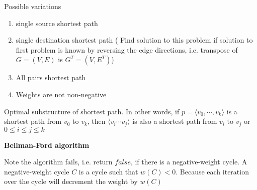 \documentclass[11pt]{article}
\begin{document}
Possible variations
\begin{enumerate}
  \item single source shortest path
  \item single destination shortest path ( Find solution to this problem if solution to first problem is known by reversing the edge directions, i.e. transpose of $G=(V,E)$ is $G^T = (V, E^T)$)
  \item All pairs shortest path
  \item Weights are not non-negative
\end{enumerate}

\begin{proposition*}
  Optimal substructure of shortest path. In other words, if $p=  \langle v_0, \cdots, v_k \rangle$ is a shortest path from $v_0$ to $v_k$, then $ \langle v_i \cdots v_j \rangle$ is also a shortest path from $v_i$ to $v_j$ or $0\leq i \leq j \leq k$
\end{proposition*}

\begin{solution}
  \textbf{Bellman-Ford algorithm}\\
  \begin{algorithm}[H]
   \end{algorithm}

   Note the algorithm fails, i.e. return $false$, if there is a negative-weight cycle. A negative-weight cycle $C$ is a cycle such that $w(C) < 0$. Because each iteration over the cycle will decrement the weight by $w(C)$
\end{solution}
\end{document}
